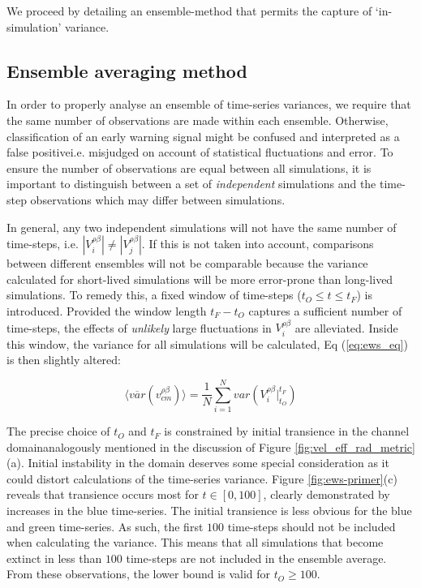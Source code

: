 We proceed by detailing an ensemble-method that permits the capture of `in-simulation' variance. %

\subsection{Ensemble averaging method}

In order to properly analyse an ensemble of time-series variances, we require that the same %
number of observations are made within each ensemble. %
Otherwise, classification of an early warning signal might be confused and interpreted as %
a false positive\textemdash i.e. misjudged on account of statistical fluctuations and error. %
To ensure the number of observations are equal between all simulations, %
it is important to distinguish between a set of \textit{independent} simulations and the %
time-step observations which may differ between simulations. %

In general, any two independent simulations will not have the same number of time-steps, %
i.e. $|V_i^{\rho\beta}| \neq |V_j^{\rho\beta}|$. %
If this is not taken into account, comparisons between different ensembles will not be %
comparable because the variance calculated for short-lived simulations will be more error-prone %
than long-lived simulations. %
To remedy this, a fixed window of time-steps ($t_O\leq t \leq t_F$) is introduced. %
Provided the window length $t_F-t_O$ captures a sufficient number of time-steps, the effects %
of \textit{unlikely} large fluctuations in $V_i^{\rho\beta}$ are alleviated. Inside this window, %
the variance for all simulations will be calculated, Eq (\ref{eq:ews_eq}) is then slightly altered: %

\begin{equation}
\label{eq:ews_eq1}
    \big\langle \overline{var}(v^{\rho\beta}_{cm}) \big\rangle = \frac{1}{N}\sum\limits_{i=1}^{N} var(V_i^{\rho\beta}\Big|^{t_F}_{t_O})
\end{equation}

The precise choice of $t_O$ and $t_F$ is constrained by initial transience in the channel %
domain\textemdash analogously mentioned in the discussion of Figure \ref{fig:vel_eff_rad_metric}(a). %
Initial instability in the domain deserves some special consideration as it could distort %
calculations of the time-series variance. %
Figure \ref{fig:ews-primer}(c) reveals that transience occurs most for $t\in[0, 100]$, %
clearly demonstrated by increases in the blue time-series. %
The initial transience is less obvious for the blue and green time-series. %
As such, the first $100$ time-steps should not be included when calculating the variance. %
This means that all simulations that become extinct in less than $100$ time-steps are not %
included in the ensemble average. From these observations, the lower bound is valid for $t_O \geq 100$.%

